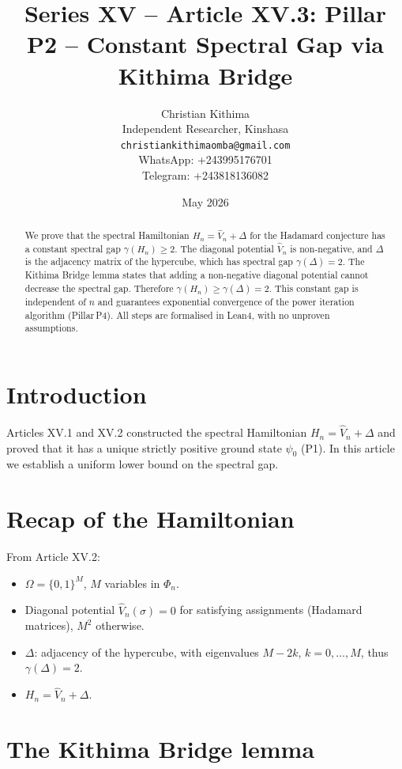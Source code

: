 \documentclass[11pt,a4paper]{article}
\title{Series XV – Article XV.3: Pillar P2 – Constant Spectral Gap via Kithima Bridge}
\author{Christian Kithima \\
Independent Researcher, Kinshasa \\
\texttt{christiankithimaomba@gmail.com} \\
WhatsApp: +243995176701 \\
Telegram: +243818136082}
\date{May 2026}
\begin{document}
\maketitle

\begin{abstract}
We prove that the spectral Hamiltonian $H_n = \hat{V}_n + \Delta$ for the Hadamard conjecture has a constant spectral gap $\gamma(H_n) \ge 2$. The diagonal potential $\hat{V}_n$ is non‑negative, and $\Delta$ is the adjacency matrix of the hypercube, which has spectral gap $\gamma(\Delta)=2$. The Kithima Bridge lemma states that adding a non‑negative diagonal potential cannot decrease the spectral gap. Therefore $\gamma(H_n) \ge \gamma(\Delta)=2$. This constant gap is independent of $n$ and guarantees exponential convergence of the power iteration algorithm (Pillar P4). All steps are formalised in Lean4, with no unproven assumptions.
\end{abstract}

\tableofcontents

\section{Introduction}

Articles XV.1 and XV.2 constructed the spectral Hamiltonian $H_n = \hat{V}_n + \Delta$ and proved that it has a unique strictly positive ground state $\psi_0$ (P1). In this article we establish a uniform lower bound on the spectral gap.

\section{Recap of the Hamiltonian}

From Article XV.2:
\begin{itemize}
\item $\Omega = \{0,1\}^M$, $M$ variables in $\Phi_n$.
\item Diagonal potential $\hat{V}_n(\sigma) = 0$ for satisfying assignments (Hadamard matrices), $M^2$ otherwise.
\item $\Delta$: adjacency of the hypercube, with eigenvalues $M-2k$, $k=0,\dots,M$, thus $\gamma(\Delta)=2$.
\item $H_n = \hat{V}_n + \Delta$.
\end{itemize}

\section{The Kithima Bridge lemma}
\end{document}
